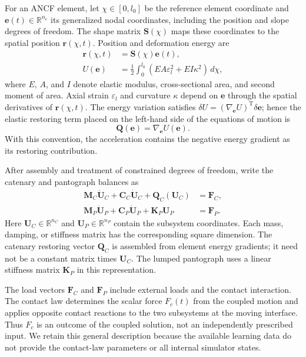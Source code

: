 \documentclass[journal,twoside]{IEEEtran}
\begin{document}
For an ANCF element, let $\chi\in[0,l_0]$ be the reference element
coordinate and $\mathbf e(t)\in\mathbb R^{n_e}$ its generalized nodal
coordinates, including the position and slope degrees of freedom. The
shape matrix $\mathbf S(\chi)$ maps these coordinates to the spatial
position $\mathbf r(\chi,t)$. Position and deformation energy are
\begin{align}
    \mathbf r(\chi,t) &= \mathbf S(\chi)\mathbf e(t),
    \label{eq:ancf_position}\\
    U(\mathbf e) &= \frac{1}{2}\int_0^{l_0}
    \left(EA\varepsilon_l^2+EI\kappa^2\right)\,d\chi,
    \label{eq:strain_energy}
\end{align}
where $E$, $A$, and $I$ denote elastic modulus, cross-sectional area, and
second moment of area. Axial strain $\varepsilon_l$ and curvature $\kappa$
depend on $\mathbf e$ through the spatial derivatives of
$\mathbf r(\chi,t)$. The energy variation satisfies
$\delta U=(\nabla_{\mathbf e}U)^{\mathrm T}\delta\mathbf e$; hence the
elastic restoring term placed on the left-hand side of the equations of
motion is
\begin{equation}
    \mathbf Q(\mathbf e)=\nabla_{\mathbf e}U(\mathbf e).
    \label{eq:generalized_force}
\end{equation}
With this convention, the acceleration contains the negative energy
gradient as its restoring contribution.

After assembly and treatment of constrained degrees of freedom, write the
catenary and pantograph balances as
\begin{align}
    \mathbf M_C\ddot{\mathbf U}_C+
    \mathbf C_C\dot{\mathbf U}_C+\mathbf Q_C(\mathbf U_C)
    &=\mathbf F_C,
    \label{eq:catenary_dynamics}\\
    \mathbf M_P\ddot{\mathbf U}_P+
    \mathbf C_P\dot{\mathbf U}_P+\mathbf K_P\mathbf U_P
    &=\mathbf F_P.
    \label{eq:pantograph_dynamics}
\end{align}
Here $\mathbf U_C\in\mathbb R^{n_C}$ and
$\mathbf U_P\in\mathbb R^{n_P}$ contain the subsystem coordinates.
Each mass, damping, or stiffness matrix has the corresponding square
dimension. The catenary restoring vector $\mathbf Q_C$ is assembled from
element energy gradients; it need not be a constant matrix times
$\mathbf U_C$. The lumped pantograph uses a linear stiffness matrix
$\mathbf K_P$ in this representation.

The load vectors $\mathbf F_C$ and $\mathbf F_P$ include external loads
and the contact interaction. The contact law determines the scalar force
$F_c(t)$ from the coupled motion and applies opposite contact reactions to
the two subsystems at the moving interface. Thus $F_c$ is an outcome of
the coupled solution, not an independently prescribed input. We retain
this general description because the available learning data do not
provide the contact-law parameters or all internal simulator states.
\end{document}
